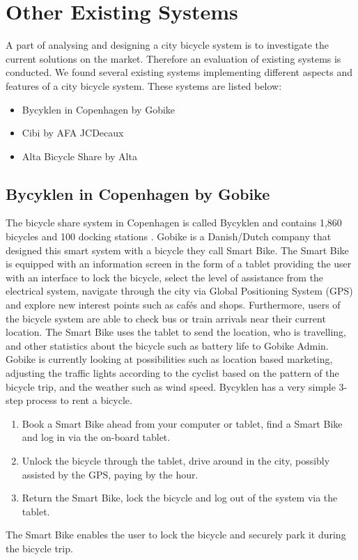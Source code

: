 \section{Other Existing Systems}
A part of analysing and designing a city bicycle system is to investigate the current solutions on the market. 
Therefore an evaluation of existing systems is conducted.
We found several existing systems implementing different aspects and features of a city bicycle system. 
These systems are listed below:
\begin{itemize}
\item Bycyklen in Copenhagen by Gobike
\item Cibi by AFA JCDecaux
\item Alta Bicycle Share by Alta
\end{itemize}
\subsection{Bycyklen in Copenhagen by Gobike}
The bicycle share system in Copenhagen is called Bycyklen and contains 1,860 bicycles and 100 docking stations \citep{misc:bycyklen}. 
Gobike is a Danish/Dutch company that designed this smart system with a bicycle they call Smart Bike. 
The Smart Bike is equipped with an information screen in the form of a tablet providing the user with an interface to lock the bicycle, select the level of assistance from the electrical system, navigate through the city via Global Positioning System (GPS) and explore new interest points such as cafés and shops.
Furthermore, users of the bicycle system are able to check bus or train arrivals near their current location.
The Smart Bike uses the tablet to send the location, who is travelling, and other statistics about the bicycle such as battery life to Gobike Admin.
Gobike is currently looking at possibilities such as location based marketing, adjusting the traffic lights according to the cyclist based on the pattern of the bicycle trip, and the weather such as wind speed.
Bycyklen has a very simple 3-step process to rent a bicycle.
\begin{enumerate}
\item Book a Smart Bike ahead from your computer or tablet, find a Smart Bike and log in via the on-board tablet.
\item Unlock the bicycle through the tablet, drive around in the city, possibly assisted by the GPS, paying by the hour.
\item Return the Smart Bike, lock the bicycle and log out of the system via the tablet.
\end{enumerate}
The Smart Bike enables the user to lock the bicycle and securely park it during the bicycle trip.

